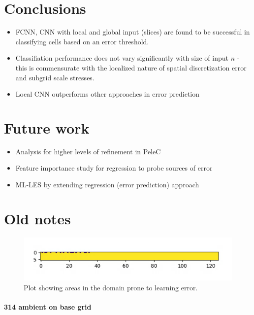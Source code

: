 \documentclass{article}
\begin{document}
\section{Conclusions}

\begin{itemize}
		\item FCNN, CNN with local and global input (slices) are found to be successful in classifying cells based on an error threshold.
		\item Classifiation performance does not vary significantly with size of input $n$ - this is commensurate with the localized nature of spatial discretization error and subgrid scale stresses.
		\item Local CNN outperforms other approaches in error prediction
	\end{itemize}
	
\section{Future work}

 \begin{itemize}
 	\item Analysis for higher levels of refinement in PeleC
 	\item Feature importance study for regression to probe sources of error
 	\item ML-LES by extending regression (error prediction) approach 
 \end{itemize}

\newpage
\section{Old notes}

\begin{figure}
    \centering
    \includegraphics[width = 0.8\linewidth]{figures/ML_AMR_PMF.png}
    \caption{Plot showing areas in the domain prone to learning error.}
    \label{amr_err}
\end{figure}

\paragraph{314 ambient on base grid}
\end{document}
